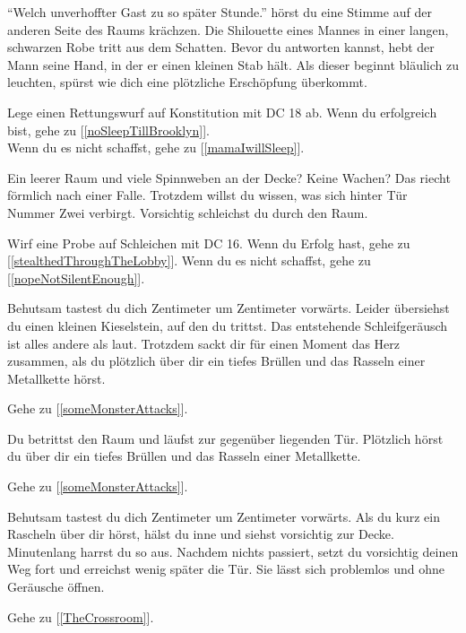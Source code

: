 ``Welch unverhoffter Gast zu so später Stunde.'' hörst du eine Stimme auf der anderen Seite des Raums krächzen. Die Shilouette eines Mannes in einer langen, schwarzen Robe tritt aus dem Schatten. Bevor du antworten kannst, hebt der Mann seine Hand, in der er einen kleinen Stab hält. Als dieser beginnt bläulich zu leuchten, spürst wie dich eine plötzliche Erschöpfung überkommt.

Lege einen Rettungswurf auf Konstitution mit DC 18 ab. Wenn du erfolgreich bist, gehe zu [\ref{noSleepTillBrooklyn}].
\\Wenn du es nicht schaffst, gehe zu [\ref{mamaIwillSleep}].


Ein leerer Raum und viele Spinnweben an der Decke? Keine Wachen? Das riecht förmlich nach einer Falle. Trotzdem willst du wissen, was sich hinter Tür Nummer Zwei verbirgt. Vorsichtig schleichst du durch den Raum.

Wirf eine Probe auf Schleichen mit DC 16. Wenn du Erfolg hast, gehe zu [\ref{stealthedThroughTheLobby}]. Wenn du es nicht schaffst, gehe zu [\ref{nopeNotSilentEnough}].


Behutsam tastest du dich Zentimeter um Zentimeter vorwärts. Leider übersiehst du einen kleinen Kieselstein, auf den du trittst. Das entstehende Schleifgeräusch ist alles andere als laut. Trotzdem sackt dir für einen Moment das Herz zusammen, als du plötzlich über dir ein tiefes Brüllen und das Rasseln einer Metallkette hörst.

Gehe zu [\ref{someMonsterAttacks}].


Du betrittst den Raum und läufst zur gegenüber liegenden Tür. Plötzlich hörst du über dir ein tiefes Brüllen und das Rasseln einer Metallkette.

Gehe zu [\ref{someMonsterAttacks}].


Behutsam tastest du dich Zentimeter um Zentimeter vorwärts. Als du kurz ein Rascheln über dir hörst, hälst du inne und siehst vorsichtig zur Decke. Minutenlang harrst du so aus. Nachdem nichts passiert, setzt du vorsichtig deinen Weg fort und erreichst wenig später die Tür. Sie lässt sich problemlos und ohne Geräusche öffnen.

Gehe zu [\ref{TheCrossroom}].

